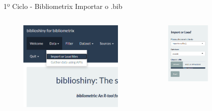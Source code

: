 \begin{frame}{1º Ciclo - Bibliometrix}
	Importar o .bib
	\begin{columns}
		\begin{figure}[hb]
			\includegraphics[width=1\textwidth]{figures/bibliometrix/b2.png}
		\end{figure}
		\begin{figure}[hb]
			\includegraphics[width=0.6\textwidth]{figures/bibliometrix/b3.png}
		\end{figure}
	\end{columns}
\end{frame}

